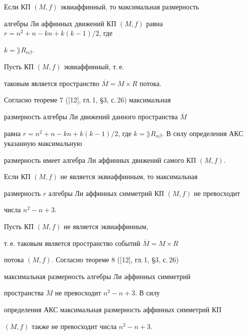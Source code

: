 \begin{thm}


Если КП $(M,f) $ эквиаффинный, то максимальная размерность


алгебры Ли аффинных движений КП $(M,f) $ равна $r=n^2+n-kn+k(k-1)/2$, где


$k=\rang R_{\alpha \beta}$.


\end{thm}





\begin{pf}


Пусть КП $(M,f) $ эквиаффинный, т.\,е.


таковым является пространство $\overline{M}=M\times R $ потока.


Согласно теореме 7 ([12], гл.\,1, \S 3, с.\,26) максимальная


размерность алгебры Ли движений данного пространства $\overline{M}$


равна $r=n^2+n-kn+k(k-1)/2$, где $ k=\rang R_{\alpha


\beta}$. В силу определения АКС указанную максимальную


размерность имеет алгебра Ли аффинных движений самого КП $(M,f)$.


\end{pf}





\begin{thm}


Если КП $(M,f) $ не является эквиаффинным, то максимальная


размерность $r$ алгебры Ли аффинных симметрий КП $(M,f) $ не превосходит


числа $n^2-n+3$.


\end{thm}





\begin{pf}


Пусть КП $(M,f) $ не является эквиаффинным,


т.\,е. таковым является пространство событий $\overline{M} =M\times R$


потока $(M,f)$. Согласно теореме 8 ([12], гл.\,1, \S 3, с.\,26)


максимальная размерность алгебры Ли аффинных симметрий


пространства $\overline{M} $ не превосходит $n^2-n+3$. В силу


определения АКС максимальная размерность аффинных симметрий КП


$(M,f) $ также не превосходит числа $n^2-n+3$.


\end{pf}


